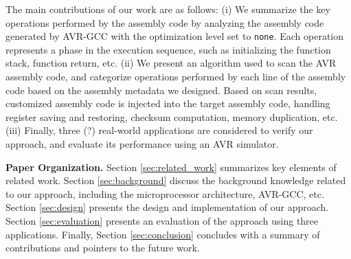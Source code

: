 The main contributions of our work are as follows: (i) We summarize the key operations performed by the assembly code by analyzing the assembly code generated by AVR-GCC with the optimization level set to \texttt{none}. Each operation represents a phase in the execution sequence, such as initializing the function stack, function return, etc. (ii) We present an algorithm used to scan the AVR assembly code, and categorize operations performed by each line of the assembly code based on the assembly metadata we designed. Based on scan results, customized assembly code is injected into the target assembly code, handling register saving and restoring, checksum computation, memory duplication, etc. (iii) Finally, three (?) real-world applications are considered to verify our approach, and evaluate its performance using an AVR simulator.

{\bf Paper Organization.} Section \ref{sec:related_work} summarizes key elements of related work. Section \ref{sec:background} discuss the background knowledge related to our approach, including the microprocessor architecture, AVR-GCC, etc. Section \ref{sec:design} presents the design and implementation of our approach. Section \ref{sec:evaluation} presents an evaluation of the approach using three applications. Finally, Section \ref{sec:conclusion} concludes with a summary of contributions and pointers to the future work.
